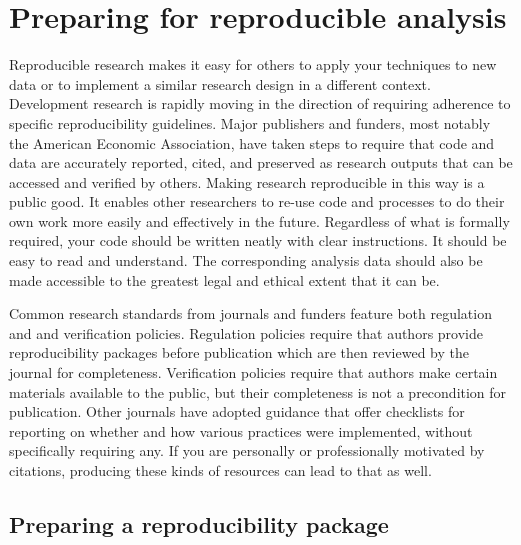 \section{Preparing for reproducible analysis}

Reproducible research makes it easy
for others to apply your techniques to new data
or to implement a similar research design in a different context.
Development research is rapidly moving in the direction of requiring adherence
to specific reproducibility guidelines.\cite{christensen2018transparency}
Major publishers and funders, most notably the American Economic Association,
have taken steps to require that code and data
are accurately reported, cited, and preserved as research outputs
that can be accessed and verified by others.
Making research reproducible in this way is a public good.
It enables other researchers to re-use code and processes
to do their own work more easily and effectively in the future.
Regardless of what is formally required,
your code should be written neatly with clear instructions.
It should be easy to read and understand.
The corresponding analysis data should also be made accessible
to the greatest legal and ethical extent that it can be.

Common research standards from journals and funders feature both
regulation and and verification policies.\cite{stodden2013toward}
Regulation policies require that authors
provide reproducibility packages before publication
which are then reviewed by the journal for completeness.
Verification policies require that authors
make certain materials available to the public,
but their completeness is not a precondition for publication.
Other journals have adopted guidance that offer checklists
for reporting on whether and how various practices were implemented,
without specifically requiring any.\cite{nosek2015promoting}
If you are personally or professionally motivated by citations,
producing these kinds of resources can lead to that as well.


\subsection{Preparing a reproducibility package}

